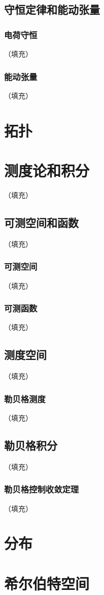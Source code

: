 \documentclass[hyperref,UTF8]{ctexbook}
\begin{document}
\section{守恒定律和能动张量}

\subsection{电荷守恒}（填充）
\subsection{能动张量}（填充）
\chapter{拓扑}

\chapter{测度论和积分}（填充）
\section{可测空间和函数}（填充）
\subsection{可测空间}（填充）
\subsection{可测函数}（填充）
\section{测度空间}（填充）
\subsection{勒贝格测度}（填充）
\section{勒贝格积分}（填充）
\subsection{勒贝格控制收敛定理}（填充）
\chapter{分布}

\chapter{希尔伯特空间}

\end{document}
